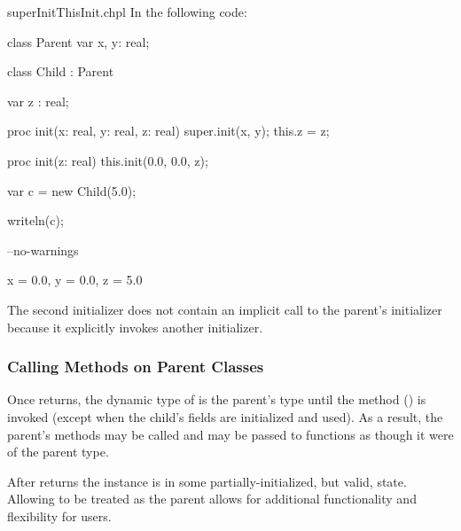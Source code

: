 \begin{chapelexample}{superInitThisInit.chpl}
In the following code:
\begin{chapel}
class Parent {
  var x, y: real;
}

class Child : Parent {
  var z : real;

  proc init(x: real, y: real, z: real) {
    super.init(x, y);
    this.z = z;
  }

  proc init(z: real) {
    this.init(0.0, 0.0, z);
  }
}

var c = new Child(5.0);
\end{chapel}
\begin{chapelpost}
writeln(c);
\end{chapelpost}
\begin{chapelcompopts}
--no-warnings
\end{chapelcompopts}
\begin{chapeloutput}
{x = 0.0, y = 0.0, z = 5.0}
\end{chapeloutput}
The second initializer does not contain an implicit call to the parent's
initializer because it explicitly invokes another initializer.
\end{chapelexample}

\subsubsection{Calling Methods on Parent Classes}
\label{Calling_Methods_on_Parent_Classes}

Once  returns, the dynamic type of  is the
parent's type until the  method
() is invoked (except when
the child's fields are initialized and used). As a result, the parent's methods
may be called and  may be passed to functions as though it were of
the parent type.

\begin{rationale}
After  returns the instance is in some
partially-initialized, but valid, state. Allowing  to be treated as
the parent allows for additional functionality and flexibility for users.
\end{rationale}

